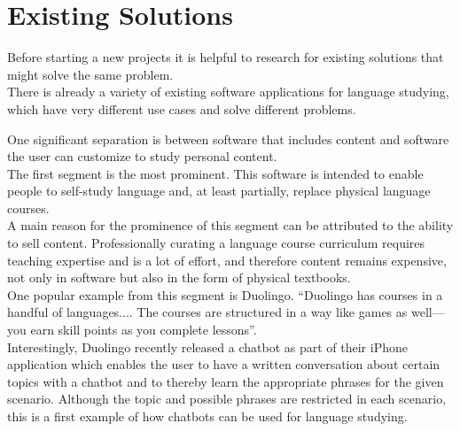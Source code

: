 \section{Existing Solutions} \label{existing}

Before starting a new projects it is helpful to research for existing solutions that might solve the same problem.
\\
There is already a variety of existing software applications for language studying, which have very different use cases and solve different problems.

One significant separation is between software that includes content and software the user can customize to study personal content.
\\

The first segment is the most prominent. This software is intended to enable people to self-study language and, at least partially, replace physical language courses.
\\
A main reason for the prominence of this segment can be attributed to the ability to sell content.
Professionally curating a language course curriculum requires teaching expertise and is a lot of effort, and therefore content remains expensive, not only in software but also in the form of physical textbooks.
\\
One popular example from this segment is Duolingo. ``Duolingo has courses in a handful of languages.... The courses are structured in a way like games as well—you earn skill points as you complete lessons''\cite{lifehacker}.
\\
Interestingly, Duolingo recently released a chatbot\cite{topbots2} as part of their iPhone application which enables the user to have a written conversation about certain topics with a chatbot and to thereby learn the appropriate phrases for the given scenario. Although the topic and possible phrases are restricted in each scenario, this is a first example of how chatbots can be used for language studying.



